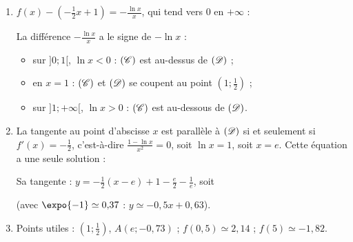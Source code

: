 \begin{enumerate}
      $f$ est strictement d\'ecroissante sur $]0 ; +\infty[$.
      En $0^+$ : $\frac{1}{x} \to +\infty$ et $-\ln x \to +\infty$, donc $-\frac{\ln x}{x} \to +\infty$ et $f(x) \to +\infty$
      (l'axe des ordonn\'ees est asymptote verticale).
      En $+\infty$ : $\frac{\ln x}{x} \to 0$ et $1 - \frac{x}{2} \to -\infty$, donc $f(x) \to -\infty$.
      \[
         \begin{array}{c|ccc}
            x & 0 & & +\infty \\ \hline
            f'(x) & & - & \\ \hline
            & +\infty & & \\
            f & & \searrow & \\
            & & & -\infty
         \end{array}
      \]
   \item {}
      $f(x) - \left(-\frac{1}{2}x + 1\right) = -\frac{\ln x}{x}$, qui tend vers $0$ en $+\infty$ :
      \par\noindent{}
      La diff\'erence $-\frac{\ln x}{x}$ a le signe de $-\ln x$ :
      \begin{itemize}
         \item sur $]0 ; 1[$, $\ln x < 0$ : $(\mathscr{C})$ est au-dessus de $(\mathscr{D})$ ;
         \item en $x = 1$ : $(\mathscr{C})$ et $(\mathscr{D})$ se coupent au point $\left(1 ; \frac{1}{2}\right)$ ;
         \item sur $]1 ; +\infty[$, $\ln x > 0$ : $(\mathscr{C})$ est au-dessous de $(\mathscr{D})$.
      \end{itemize}
   \item {}
      La tangente au point d'abscisse $x$ est parall\`ele \`a $(\mathscr{D})$ si et seulement si $f'(x) = -\frac{1}{2}$, c'est-\`a-dire
      $\frac{1 - \ln x}{x^2} = 0$, soit $\ln x = 1$, soit $x = e$. Cette \'equation a une seule solution :
      \par\noindent{}
      Sa tangente : $y = -\frac{1}{2}(x - e) + 1 - \frac{e}{2} - \frac{1}{e}$, soit
      \par\noindent{} (avec $\expo{-1} \simeq 0{,}37$ : $y \simeq -0{,}5x + 0{,}63$).
   \item {}
      Points utiles : $\left(1 ; \frac{1}{2}\right)$, $A(e ; -0{,}73)$ ; $f(0{,}5) \simeq 2{,}14$ ; $f(5) \simeq -1{,}82$.

\end{enumerate}
